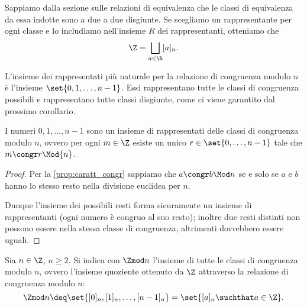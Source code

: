 Sappiamo dalla sezione sulle relazioni di equivalenza che le classi di equivalenza da essa indotte sono a due a due disgiunte. Se scegliamo un rappresentante per ogni classe e lo includiamo nell'insieme $R$ dei rappresentanti, otteniamo che \[
    \Z = \bigsqcup_{a \in \R} [a]_n. 
\]

L'insieme dei rappresentati più naturale per la relazione di congruenza modulo $n$ è l'insieme $\set{0, 1, \dots, n-1}$. Essi rappresentano tutte le classi di congruenza possibili e rappresentano tutte classi disgiunte, come ci viene garantito dal prossimo corollario.

\begin{corollary}
    I numeri $0, 1, \dots, n-1$ sono un insieme di rappresentati delle classi di congruenza modulo $n$, ovvero per ogni $m \in \Z$ esiste un unico $r \in \set{0, \dots, n-1}$ tale che $m \congr r \Mod{n}$.
\end{corollary}
\begin{proof}
    Per la \autoref{prop:caratt_congr} sappiamo che $a \congr b \Mod n$ se e solo se $a$ e $b$ hanno lo stesso resto nella divisione euclidea per $n$.

    Dunque l'insieme dei possibili resti forma sicuramente un insieme di rappresentanti (ogni numero è congruo al suo resto); inoltre due resti distinti non possono essere nella stessa classe di congruenza, altrimenti dovrebbero essere uguali.
\end{proof}

\begin{definition}
    Sia $n \in \Z$, $n \geq 2$. Si indica con $\Zmod n$ l'insieme di tutte le classi di congruenza modulo $n$, ovvero l'insieme quoziente ottenuto da $\Z$ attraverso la relazione di congruenza modulo $n$: \begin{equation}
        \Zmod n \deq \set{[0]_n, [1]_n, \dots, [n-1]_n} = \set{[a]_n \suchthat a \in \Z}.
    \end{equation}
\end{definition}

